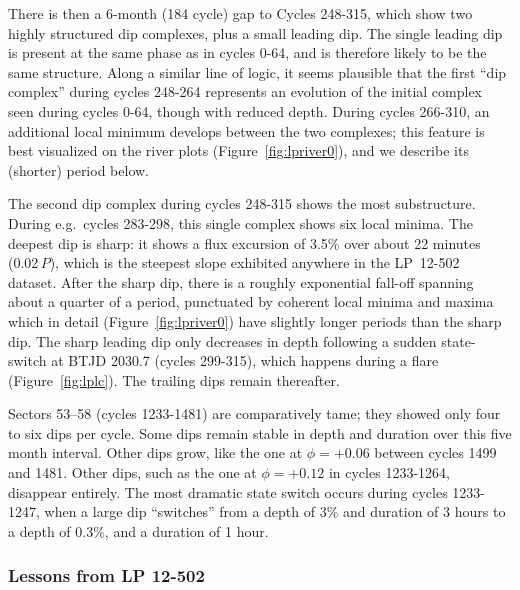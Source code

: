 \documentclass[11pt,twocolumn,tighten]{aastex63}
\begin{document}
There is then a 6-month (184 cycle) gap to Cycles 248-315, which show
two highly structured dip complexes, plus a small leading dip.  The
single leading dip is present at the same phase as in cycles 0-64, and
is therefore likely to be the same structure.  Along a similar line of
logic, it seems plausible that the first ``dip complex'' during cycles
248-264 represents an evolution of the initial complex seen during
cycles 0-64, though with reduced depth.  During cycles 266-310, an
additional local minimum develops between the two complexes; this
feature is best visualized on the river plots
(Figure~\ref{fig:lpriver0}), and we describe its (shorter) period
below.

The second dip complex during cycles 248-315 shows the most
substructure.  During e.g.~cycles 283-298, this single complex shows
six local minima.  The deepest dip is sharp: it shows a flux excursion
of 3.5\% over about 22 minutes (0.02\,$P$), which is the steepest
slope exhibited anywhere in the LP~12-502 dataset.  After the sharp
dip, there is a roughly exponential fall-off spanning about a quarter
of a period, punctuated by coherent local minima and maxima which in
detail (Figure~\ref{fig:lpriver0}) have slightly longer periods than
the sharp dip.  The sharp leading dip only decreases in depth
following a sudden state-switch at BTJD 2030.7 (cycles 299-315), which
happens during a flare (Figure~\ref{fig:lplc}).  The trailing dips
remain thereafter.

Sectors 53--58 (cycles 1233-1481) are comparatively tame; they showed
only four to six dips per cycle.  Some dips remain stable in depth and
duration over this five month interval.  Other dips grow, like the one
at $\phi = +0.06$ between cycles 1499 and 1481.  Other dips, such as
the one at $\phi = +0.12$ in cycles 1233-1264, disappear entirely.
The most dramatic state switch occurs during cycles 1233-1247, when a
large dip ``switches'' from a depth of 3\% and duration of 3 hours to
a depth of 0.3\%, and a duration of 1 hour.


\subsubsection{Lessons from LP 12-502}
\label{subsec:lplessons}
\end{document}
